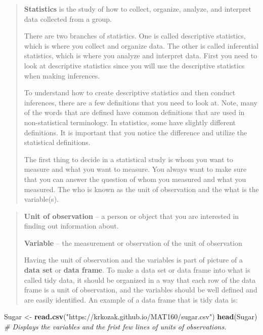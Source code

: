 \documentclass[]{book}
\newenvironment{Shaded}{\begin{snugshade}}{\end{snugshade}}
\newcommand{\CommentTok}[1]{\textcolor[rgb]{0.56,0.35,0.01}{\textit{#1}}}
\newcommand{\KeywordTok}[1]{\textcolor[rgb]{0.13,0.29,0.53}{\textbf{#1}}}
\newcommand{\NormalTok}[1]{#1}
\newcommand{\StringTok}[1]{\textcolor[rgb]{0.31,0.60,0.02}{#1}}
\begin{document}
\begin{quote}
\textbf{Statistics} is the study of how to collect, organize, analyze, and interpret data collected from a group.

There are two branches of statistics. One is called descriptive statistics, which is where you collect and organize data. The other is called inferential statistics, which is where you analyze and interpret data. First you need to look at descriptive statistics since you will use the descriptive statistics when making inferences.

To understand how to create descriptive statistics and then conduct inferences, there are a few definitions that you need to look at. Note, many of the words that are defined have common definitions that are used in non-statistical terminology. In statistics, some have slightly different definitions. It is important that you notice the difference and utilize the statistical definitions.

The first thing to decide in a statistical study is whom you want to measure and what you want to measure. You always want to make sure that you can answer the question of whom you measured and what you measured. The who is known as the unit of observation and the what is the variable(s).
\end{quote}

\begin{quote}
\textbf{Unit of observation} -- a person or object that you are interested in finding out information about.

\textbf{Variable} -- the measurement or observation of the unit of observation

Having the unit of observation and the variables is part of picture of a \textbf{data set} or \textbf{data frame}. To make a data set or data frame into what is called tidy data, it should be organized in a way that each row of the data frame is a unit of observation, and the variables should be well defined and are easily identified. An example of a data frame that is tidy data is:
\end{quote}

\begin{Shaded}
\begin{Highlighting}[]
\NormalTok{Sugar <-}\StringTok{ }\KeywordTok{read.csv}\NormalTok{(}\StringTok{"https://krkozak.github.io/MAT160/sugar.csv"}\NormalTok{)}
\KeywordTok{head}\NormalTok{(Sugar) }\CommentTok{# Displays the variables and the frist few lines of units of observations.}
\end{Highlighting}
\end{Shaded}
\end{document}
